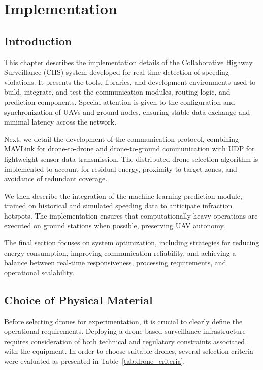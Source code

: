 \chapter{Implementation} 


\section*{Introduction}

This chapter describes the implementation details of the Collaborative Highway Surveillance (CHS) system developed for real-time detection of speeding violations. It presents the tools, libraries, and development environments used to build, integrate, and test the communication modules, routing logic, and prediction components. Special attention is given to the configuration and synchronization of UAVs and ground nodes, ensuring stable data exchange and minimal latency across the network.

Next, we detail the development of the communication protocol, combining MAVLink for drone-to-drone and drone-to-ground communication with UDP for lightweight sensor data transmission. The distributed drone selection algorithm is implemented to account for residual energy, proximity to target zones, and avoidance of redundant coverage.

We then describe the integration of the machine learning prediction module, trained on historical and simulated speeding data to anticipate infraction hotspots. The implementation ensures that computationally heavy operations are executed on ground stations when possible, preserving UAV autonomy.

The final section focuses on system optimization, including strategies for reducing energy consumption, improving communication reliability, and achieving a balance between real-time responsiveness, processing requirements, and operational scalability.


\section{Choice of Physical Material}

Before selecting drones for experimentation, it is crucial to clearly define the operational requirements. 
Deploying a drone-based surveillance infrastructure requires consideration of both technical and 
regulatory constraints associated with the equipment. In order to choose suitable drones, several 
selection criteria were evaluated as presented in Table~\ref{tab:drone_criteria}.

